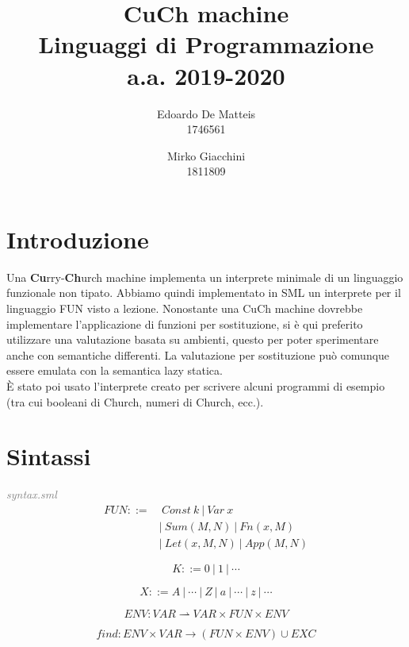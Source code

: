 \documentclass[a4paper]{article}
\title{%
	CuCh machine \\
  	\large Linguaggi di Programmazione \\ 
	a.a. 2019-2020}
\author{Edoardo De Matteis  \\ 1746561 
   \and Mirko Giacchini \\ 1811809 }
\date{}
\begin{document}
	\maketitle
	\tableofcontents
	
	\section{Introduzione}
	Una \textbf{Cu}rry-\textbf{Ch}urch machine implementa un interprete minimale di un linguaggio funzionale non tipato. Abbiamo quindi implementato in SML un interprete per il linguaggio FUN visto a lezione. Nonostante una CuCh machine dovrebbe implementare l'applicazione di funzioni per sostituzione, si è qui preferito utilizzare una valutazione basata su ambienti, questo per poter sperimentare anche con semantiche differenti. La valutazione per sostituzione può comunque essere emulata con la semantica lazy statica.\\
È stato poi usato l'interprete creato per scrivere alcuni programmi di esempio (tra cui booleani di Church, numeri di Church, ecc.).
	\section{Sintassi}
	\textit{\textcolor{gray}{syntax.sml}} \\
	 
	\begin{equation} \label{fun}
	\begin{split}
		FUN ::= & \ Const \ k \ |\ Var \ x \\
			&|\ Sum(M, N) \ |\ Fn(x, M) \\ 
			&|\ Let(x, M, N) \ |\ App(M, N) 
	\end{split}
	\end{equation}

	\begin{equation}
		K ::= 0 \ | \ 1 \ | \ \cdots
	\end{equation}
	
	\begin{equation}
		X ::= A \ | \ \cdots \ | \ Z \ | \ a \ | \ \cdots \ | \ z \ | \ \cdots
	\end{equation}

	\begin{equation} \label{env}
		ENV : VAR \rightharpoonup VAR \times FUN \times ENV
	\end{equation}

	\begin{equation} \label{find}
		find: ENV \times VAR \rightarrow (FUN \times ENV) \cup EXC
	\end{equation}
	
\end{document}
